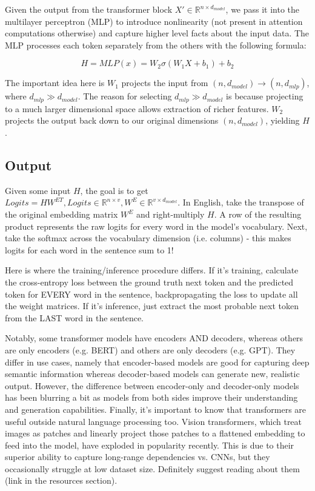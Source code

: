 \documentclass[12pt]{article}
\begin{document}
Given the output from the transformer block $X' \in \mathbb{R}^{n \times d_{model}}$, we pass it into the multilayer perceptron (MLP) to introduce nonlinearity (not present in attention computations otherwise) and capture higher level facts about the input data. The MLP processes each token separately from the others with the following formula: 

$$H = MLP(x) = W_2\sigma(W_1X + b_1) + b_2$$

The important idea here is \(W_1\) projects the input from \((n, d_{model}) \rightarrow (n, d_{mlp})\),
where \(d_{mlp} \gg d_{model}\). The reason for selecting \(d_{mlp} \gg d_{model}\) is because projecting to a much larger dimensional space allows extraction of richer features. \(W_2\) projects the output back down to our original dimensions \((n, d_{model})\), yielding $H$. 

\subsection{Output}

Given some input $H$, the goal is to get 
\(Logits = HW^{ET}, Logits \in \mathbb{R}^{n \times v}, W^E \in \mathbb{R}^{v \times d_{model}}\). In English, take the transpose of the original embedding matrix $W^E$ and right-multiply $H$. A row of the resulting product represents the raw logits for every word in the model's vocabulary. Next, take the softmax across the vocabulary dimension (i.e. columns) - this makes logits for each word in the sentence sum to 1! 

Here is where the training/inference procedure differs. If it's training, calculate the cross-entropy loss between the ground truth next token and the predicted token for EVERY word in the sentence, backpropagating the loss to update all the weight matrices. If it's inference, just extract the most probable next token from the LAST word in the sentence. 

Notably, some transformer models have encoders AND decoders, whereas others are only encoders (e.g. BERT) and others are only decoders (e.g. GPT). They differ in use cases, namely that encoder-based models are good for capturing deep semantic information whereas decoder-based models can generate new, realistic output. However, the difference between encoder-only and decoder-only models has been blurring a bit as models from both sides improve their understanding and generation capabilities. Finally, it's important to know that transformers are useful outside natural language processing too. Vision transformers, which treat images as patches and linearly project those patches to a flattened embedding to feed into the model, have exploded in popularity recently. This is due to their superior ability to capture long-range dependencies vs. CNNs, but they occasionally struggle at low dataset size. Definitely suggest reading about them (link in the resources section). 
\end{document}
